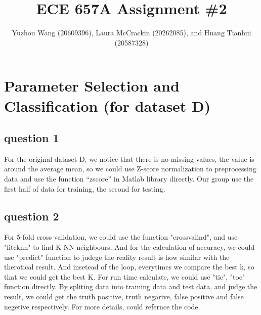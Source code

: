 \documentclass[]{article}
\title{ECE 657A Assignment \#2}
\author{Yuzhou Wang (20609396), Laura McCrackin (20262085), \newline and   Huang Tianhui (20587328)       }
\begin{document}
\maketitle



\section{Parameter Selection and Classification (for dataset D)}

\subsection{question 1}

For the original dataset D, we notice that there is no missing values, the value is around the average mean, so we could use Z-score normalization to preprocessing data and use the function “zscore” in Matlab library directly. Our group use the first half of data for training, the second for testing.




\subsection{question 2}

For 5-fold cross validation, we could use the function "crossvalind", and use "fitcknn" to find K-NN neighbours. And for the calculation of accuracy, we could use "predict" function to judege the reality result is how similar with the therotical result. And insetead of the loop, everytimes we compare the best k, so that we could get the best K. For run time calculate, we could use "tic", "toc" function directly. By spliting data into training data and test data, and judge the result, we could get the truth positive, truth negarive, false positive and false negetive respectively. For more details, could refernce the code.
\end{document}
